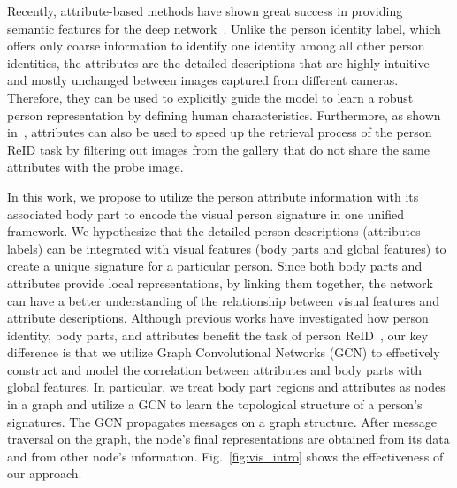 \documentclass[final]{cvpr}
\begin{document}
Recently, attribute-based methods have shown great success in providing semantic features for the deep network~\cite{affnet,aanet}. Unlike the person identity label, which offers only coarse information to identify one identity among all other person identities, the attributes are the detailed descriptions that are highly intuitive and mostly unchanged between images captured from different cameras. Therefore, they can be used to explicitly guide the model to learn a robust person representation by defining human characteristics. Furthermore, as shown in~\cite{attreid}, attributes can also be used to speed up the retrieval process of the person ReID task by filtering out images from the gallery that do not share the same attributes with the probe image.

In this work, we propose to utilize the person attribute information with its associated body part to encode the visual person signature in one unified framework. We hypothesize that the detailed person descriptions (attributes labels) can be integrated with visual features (body parts and global features) to create a unique signature for a particular person. Since both body parts and attributes provide local representations, by linking them together, the network can have a better understanding of the relationship between visual features and attribute descriptions. Although previous works have investigated how person identity, body parts, and attributes benefit the task of person ReID~\cite{attreid,PAAN,ACRN,aanet}, our key difference is that we utilize Graph Convolutional Networks (GCN) to effectively construct and model the correlation between attributes and body parts with global features. In particular, we treat body part regions and attributes as nodes in a graph and utilize a GCN to learn the topological structure of a person's signatures. The GCN propagates messages on a graph structure. After message traversal on the graph, the node's final representations are obtained from its data and from other node's information. Fig.~\ref{fig:vis_intro} shows the effectiveness of our approach.
\end{document}
